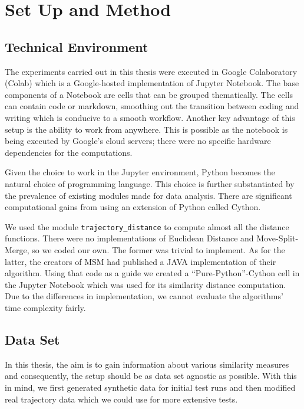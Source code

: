 \chapter{Set Up and Method}
\label{ch:5}

\section{Technical Environment}

The experiments carried out in this thesis were executed in Google Colaboratory (Colab) which is a Google-hosted implementation of Jupyter Notebook\cite{72-GoogleColaboratory,73-ProjectJupyter}. 
The base components of a Notebook are cells that can be grouped thematically. 
The cells can contain code or markdown, smoothing out the transition between coding and writing which is conducive to a smooth workflow.
Another key advantage of this setup is the ability to work from anywhere. This is possible as the notebook is being executed by Google's cloud servers; there were no specific hardware dependencies for the computations. 

Given the choice to work in the Jupyter environment, Python becomes the natural choice of programming language\cite{74-WelcomePython}. 
This choice is further substantiated by the prevalence of existing modules made for data analysis.
There are significant computational gains from using an extension of Python called Cython\cite{75-CythonBest}. 

We used the module \texttt{trajectory_distance}\cite{43-TrajectoryDistance} to compute almost all the distance functions. 
There were no implementations of Euclidean Distance and Move-Split-Merge, so we coded our own. 
The former was trivial to implement.
As for the latter, the creators of MSM had published a JAVA implementation of their algorithm. 
Using that code as a guide we created a “Pure-Python”-Cython cell in the Jupyter Notebook which was used for its similarity distance computation.  
Due to the differences in implementation, we cannot evaluate the algorithms’ time complexity fairly.


\clearpage
\section{Data Set}
In this thesis, the aim is to gain information about various similarity measures and consequently, the setup should be as data set agnostic as possible.
With this in mind, we first generated synthetic data for initial test runs and then modified real trajectory data which we could use for more extensive tests.

